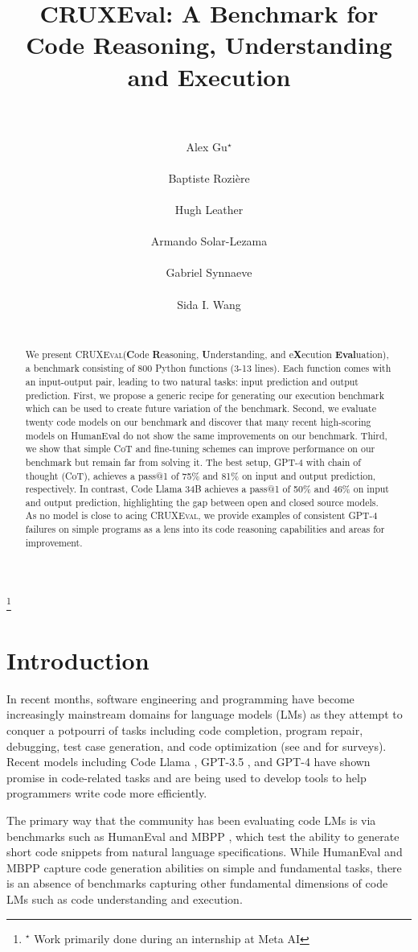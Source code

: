 \documentclass{article}
\title{CRUXEval: A Benchmark for Code Reasoning, Understanding and Execution \\ \
}
\author{\name Alex Gu$^{\star}$
\email{gua@mit.edu} \\
\addr{MIT CSAIL} \\
\name Baptiste Rozière
\email{broz@meta.com} \\
\addr{Meta AI} \\
\name Hugh Leather
\email{hleather@meta.com} \\
\addr{Meta AI} \\
\name Armando Solar-Lezama
\email{asolar@csail.mit.edu} \\
\addr{MIT CSAIL} \\
\name Gabriel Synnaeve
\email{gab@meta.com} \\
\addr{Meta AI} \\
\name Sida I. Wang
\email{sida@meta.com} \\
\addr{Meta AI} \\
}
\newcommand{\benchmark}{\textsc{CRUXEval}\xspace}
\newcommand\nnfootnote[1]{%
  \begin{NoHyper}
  \renewcommand\thefootnote{}\footnote{#1}%
  \addtocounter{footnote}{-1}%
  \end{NoHyper}
}
\begin{document}
\maketitle
\raggedbottom

\nnfootnote{$^{\star}$ Work primarily done during an internship at Meta AI}

\begin{abstract}
We present \benchmark (\textbf{C}ode \textbf{R}easoning, \textbf{U}nderstanding, and e\textbf{X}ecution \textbf{Eval}uation), a benchmark consisting of 800 Python functions (3-13 lines). Each function comes with an input-output pair, leading to two natural tasks: input prediction and output prediction. First, we propose a generic recipe for generating our execution benchmark which can be used to create future variation of the benchmark. Second, we evaluate twenty code models on our benchmark and discover that many recent high-scoring models on HumanEval do not show the same improvements on our benchmark. Third, we show that simple CoT and fine-tuning schemes can improve performance on our benchmark but remain far from solving it. The best setup, GPT-4 with chain of thought (CoT), achieves a pass@1 of 75\% and 81\% on input and output prediction, respectively. In contrast, Code Llama 34B achieves a pass@1 of 50\% and 46\% on input and output prediction, highlighting the gap between open and closed source models. As no model is close to acing \benchmark, we provide examples of consistent GPT-4 failures on simple programs as a lens into its code reasoning capabilities and areas for improvement. 
\end{abstract}

\section{Introduction} \label{sec:introduction}
In recent months, software engineering and programming have become increasingly mainstream domains for language models (LMs) as they attempt to conquer a potpourri of tasks including code completion, program repair, debugging, test case generation, and code optimization (see \citet{zan2023large} and \citet{fan2023large} for surveys). Recent models including Code Llama \citep{roziere2023code}, GPT-3.5 \citep{brown2020language, ouyang2022training}, and GPT-4 \citep{openai2023gpt} have shown promise in code-related tasks and are being used to develop tools to help programmers write code more efficiently.

The primary way that the community has been evaluating code LMs is via benchmarks such as HumanEval \citep{chen2021evaluating} and MBPP \citep{austin2021program}, which test the ability to generate short code snippets from natural language specifications. While HumanEval and MBPP capture code generation abilities on simple and fundamental tasks, there is an absence of benchmarks capturing other fundamental dimensions of code LMs such as code understanding and execution. 
\end{document}
